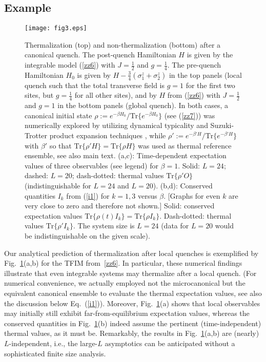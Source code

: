 \documentclass[twocolumn,aps,prb,floatfix,superscriptaddress]{revtex4-2}
\newcommand{\<}{\left\langle}	%
\renewcommand{\>}{\right\rangle}	%
\newcommand{\tr}{\mbox{Tr}}
\begin{document}
\subsection{Example}

\begin{figure}
\texttt{[image: fig3.eps]}
\caption{Thermalization (top) and non-thermalization (bottom)
after a canonical quench.  
The post-quench Hamiltonian $H$ is given by
the integrable model (\ref{zz6})
with $J=\frac{1}{2}$ and $g=\frac{1}{4}$.
The pre-quench Hamiltonian $H_0$ is given by
$H - \frac{3}{4} (\sigma^z_1 + \sigma^z_2)$
in the top panels 
(local quench such that the total transverse field is $g=1$ for 
the first two sites, but $g = \frac{1}{4}$ for all other sites),
and by $H$ from (\ref{zz6}) with $J=\frac{1}{2}$ and $g=1$ in the bottom panels 
(global quench).
In both cases, a canonical initial state $\rho := e^{-\beta H_0}/\tr\{e^{-\beta H_0}\}$
(see (\ref{zz7}))
was numerically explored by utilizing
dynamical typicality \cite{rei20} and Suzuki-Trotter product 
expansion techniques \cite{rae04},
while
$\rho' := e^{-\beta'\! H}/\tr\{e^{-\beta'\! H}\}$
with $\beta'$ so that $\tr\{ \rho' H \}=\tr\{\rho H \}$
was used as thermal reference ensemble,
see also main text.
(a,c): Time-dependent expectation values 
of three observables (see legend)
for $\beta=1$.
Solid: $L = 24$;
dashed: $L = 20$;
dash-dotted: 
thermal values $\tr\{\rho'O\}$
(indistinguishable for $L=24$ and $L=20$).
(b,d): 
Conserved quantities $I_k$ 
from (\ref{i1})
for 
$k=1,3$
versus $\beta$.
[Graphs for even $k$ are very close to zero and therefore not shown.]
Solid:
conserved expectation values $\tr\{\rho(t)I_k\}=\tr\{\rho I_k\}$.
Dash-dotted:
thermal
values $\tr\{ \rho' I_k \}$.
The system size is $L = 24$ (data for $L = 20$ 
would be indistinguishable on the given scale).}
\label{fig3}
\end{figure}

Our analytical prediction of thermalization after local quenches
is exemplified by Fig.~\ref{fig3}(a,b)
for the TFIM from~\eqref{zz6}.
In particular, these numerical findings illustrate 
that even integrable systems
may thermalize after a local quench.
(For numerical convenience, we actually employed not the 
microcanonical but the equivalent canonical ensemble 
\cite{kuw20,kuw20a,tou15,bra15,tas18,rig14,rig16,mal18}
to evaluate the thermal expectation values,
see also the discussion below Eq.~(\ref{i1})).
Moreover, Fig.~\ref{fig3}(a) shows that
local observables may initially still 
exhibit far-from-equilibrium expectation values,
whereas the conserved quantities in Fig.~\ref{fig3}(b) 
indeed assume the pertinent (time-independent)
thermal values, as it must be.
Remarkably, the results in Fig.~\ref{fig3}(a,b)
are (nearly) $L$-independent, i.e., the large-$L$ 
asymptotics can be anticipated without a sophisticated 
finite size analysis.
\end{document}
